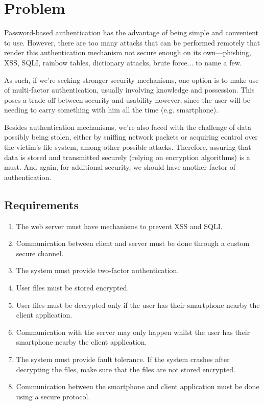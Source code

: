 \documentclass[12pt]{article}
\begin{document}

\newpage

\section{Problem}
    
Password-based authentication has the advantage of being simple and convenient to use. However, there are too many attacks that can be performed remotely that render this authentication mechanism not secure enough on its own---phishing, XSS, SQLI, rainbow tables, dictionary attacks, brute force... to name a few.\par

As such, if we're seeking stronger security mechanisms, one option is to make use of multi-factor authentication, usually involving knowledge and possession. This poses a trade-off between security and usability however, since the user will be needing to carry something with him all the time (e.g. smartphone).\par

Besides authentication mechanisms, we're also faced with the challenge of data possibly being stolen, either by sniffing network packets or acquiring control over the victim's file system, among other possible attacks. Therefore, assuring that data is stored and transmitted securely (relying on encryption algorithms) is a must. And again, for additional security, we should have another factor of authentication.\par

\subsection{Requirements}

\begin{enumerate}
  \item The web server must have mechanisms to prevent XSS and SQLI.
  \item Communication between client and server must be done through a custom secure channel.
  \item The system must provide two-factor authentication.
  \item User files must be stored encrypted.
  \item User files must be decrypted only if the user has their smartphone nearby the client application.
  \item Communication with the server may only happen whilst the user has their smartphone nearby the client application.
  \item The system must provide fault tolerance. If the system crashes after decrypting the files, make sure that the files are not stored encrypted.
  \item Communication between the smartphone and client application must be done using a secure protocol.
  
\end{enumerate}
\end{document}

